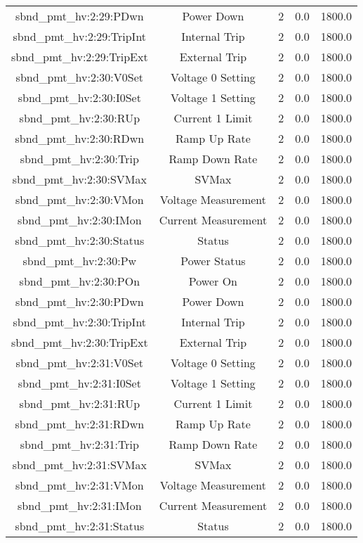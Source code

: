 \begin{table}[ptb]
\begin{tabular}{c | c c c c}
sbnd_pmt_hv:2:29:PDwn & Power Down & 2 & 0.0 & 1800.0\\ 
sbnd_pmt_hv:2:29:TripInt & Internal Trip & 2 & 0.0 & 1800.0\\ 
sbnd_pmt_hv:2:29:TripExt & External Trip & 2 & 0.0 & 1800.0\\ 
sbnd_pmt_hv:2:30:V0Set & Voltage 0 Setting & 2 & 0.0 & 1800.0\\ 
sbnd_pmt_hv:2:30:I0Set & Voltage 1 Setting & 2 & 0.0 & 1800.0\\ 
sbnd_pmt_hv:2:30:RUp & Current 1 Limit & 2 & 0.0 & 1800.0\\ 
sbnd_pmt_hv:2:30:RDwn & Ramp Up Rate & 2 & 0.0 & 1800.0\\ 
sbnd_pmt_hv:2:30:Trip & Ramp Down Rate & 2 & 0.0 & 1800.0\\ 
sbnd_pmt_hv:2:30:SVMax & SVMax & 2 & 0.0 & 1800.0\\ 
sbnd_pmt_hv:2:30:VMon & Voltage Measurement & 2 & 0.0 & 1800.0\\ 
sbnd_pmt_hv:2:30:IMon & Current Measurement & 2 & 0.0 & 1800.0\\ 
sbnd_pmt_hv:2:30:Status & Status & 2 & 0.0 & 1800.0\\ 
sbnd_pmt_hv:2:30:Pw & Power Status & 2 & 0.0 & 1800.0\\ 
sbnd_pmt_hv:2:30:POn & Power On & 2 & 0.0 & 1800.0\\ 
sbnd_pmt_hv:2:30:PDwn & Power Down & 2 & 0.0 & 1800.0\\ 
sbnd_pmt_hv:2:30:TripInt & Internal Trip & 2 & 0.0 & 1800.0\\ 
sbnd_pmt_hv:2:30:TripExt & External Trip & 2 & 0.0 & 1800.0\\ 
sbnd_pmt_hv:2:31:V0Set & Voltage 0 Setting & 2 & 0.0 & 1800.0\\ 
sbnd_pmt_hv:2:31:I0Set & Voltage 1 Setting & 2 & 0.0 & 1800.0\\ 
sbnd_pmt_hv:2:31:RUp & Current 1 Limit & 2 & 0.0 & 1800.0\\ 
sbnd_pmt_hv:2:31:RDwn & Ramp Up Rate & 2 & 0.0 & 1800.0\\ 
sbnd_pmt_hv:2:31:Trip & Ramp Down Rate & 2 & 0.0 & 1800.0\\ 
sbnd_pmt_hv:2:31:SVMax & SVMax & 2 & 0.0 & 1800.0\\ 
sbnd_pmt_hv:2:31:VMon & Voltage Measurement & 2 & 0.0 & 1800.0\\ 
sbnd_pmt_hv:2:31:IMon & Current Measurement & 2 & 0.0 & 1800.0\\ 
sbnd_pmt_hv:2:31:Status & Status & 2 & 0.0 & 1800.0\\ 

\end{tabular}
\end{table}
